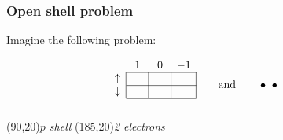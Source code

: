 \begin{frame}[t]
  \frametitle{Open shell problem}
  Imagine the following problem:
  
  \vspace{0.5em}
  \begin{equation*}
  \begin{array}{c|c|c|c|}
  \multicolumn{1}{c}{} & \multicolumn{1}{c}{\phantom{,}1\phantom{,}} & \multicolumn{1}{c}{\phantom{,}0\phantom{,}} & \multicolumn{1}{c}{-1} \\ \cline{2-4}
  \uparrow &  &  &  \\ \cline{2-4}
  \downarrow &  &  &  \\
  \cline{2-4}
  \multicolumn{1}{c}{}
  \end{array}
  \qquad \text{and} \qquad
  \bullet \ \bullet \qquad
  \end{equation*}
  \Put(90,20){\emph{$p$ shell}}
  \Put(185,20){\emph{2 electrons}}
\end{frame}

